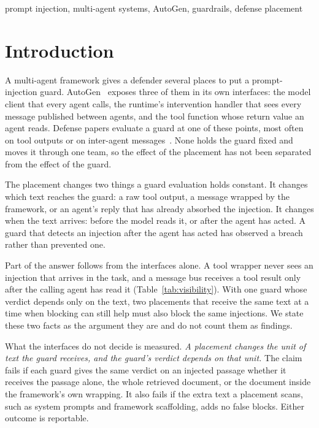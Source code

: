 \documentclass[conference]{IEEEtran}
\begin{document}
\begin{IEEEkeywords}
prompt injection, multi-agent systems, AutoGen, guardrails, defense placement
\end{IEEEkeywords}

\section{Introduction}
\label{sec:intro}

A multi-agent framework gives a defender several places to put a
prompt-injection guard. AutoGen~\cite{wu2023autogen,autogen2025repo}
exposes three of them in its own interfaces: the model client that every
agent calls, the runtime's intervention handler that sees every message
published between agents, and the tool function whose return value an agent
reads. Defense papers evaluate a guard at one of these points, most often
on tool outputs or on inter-agent
messages~\cite{chennabasappa2025llamafirewall,jha2025controlvalve,paul2026beyond,debenedetti2024agentdojo}.
None holds the guard fixed and moves it through one team, so the effect of
the placement has not been separated from the effect of the guard.

The placement changes two things a guard evaluation holds constant. It
changes which text reaches the guard: a raw tool output, a message wrapped
by the framework, or an agent's reply that has already absorbed the
injection. It changes when the text arrives: before the model reads it, or
after the agent has acted. A guard that detects an injection after the agent
has acted has observed a breach rather than prevented one.

Part of the answer follows from the interfaces alone. A tool wrapper never
sees an injection that arrives in the task, and a message bus receives a
tool result only after the calling agent has read it
(Table~\ref{tab:visibility}). With one guard whose verdict depends only on
the text, two placements that receive the same text at a time when blocking
can still help must also block the same injections. We state these two
facts as the argument they are and do not count them as findings.

What the interfaces do not decide is measured. \emph{A placement changes the
unit of text the guard receives, and the guard's verdict depends on that
unit.} The claim fails if each guard gives the same verdict on an injected
passage whether it receives the passage alone, the whole retrieved document,
or the document inside the framework's own wrapping. It also fails if the
extra text a placement scans, such as system prompts and framework
scaffolding, adds no false blocks. Either outcome is reportable.
\end{document}
